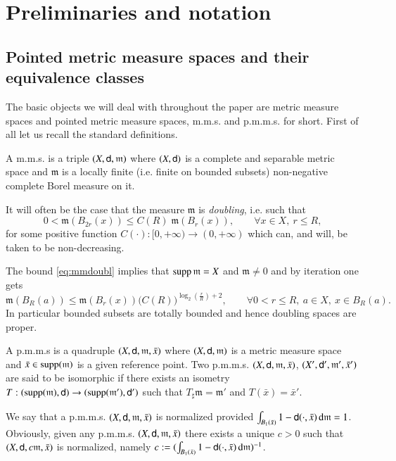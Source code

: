 \documentclass[11pt,reqno]{amsart}
\newcommand{\supp}{\mathop{\rm supp}\nolimits}
\newcommand{\mm}{\mathfrak m}
\newcommand{\sfd}{{\sf d}}
\renewcommand{\d}{{\rm{d}}}
\theoremstyle{definition}
\theoremstyle{remark}
\theoremstyle{remark}
\theoremstyle{remark}
\theoremstyle{remark}
\theoremstyle{remark}
\theoremstyle{remark}
\theoremstyle{remark}
\begin{document}
\section{Preliminaries and notation}\label{Sec:Prel}
\subsection{Pointed metric measure spaces and their equivalence classes}
The basic objects we will deal with throughout the paper are metric measure spaces and pointed metric measure spaces, m.m.s. and p.m.m.s. 
 for short. First of all let us recall the standard definitions. 
 
A m.m.s. is a triple $(X,\sfd,\mm)$ where $(X,\sfd)$ is a complete and separable metric space and  $\mm$ is a locally finite (i.e. finite on bounded subsets) non-negative complete Borel measure  on it. 
 

It will often be the case that the measure 
$\mm$ is \emph{doubling}, i.e. such that
\begin{equation}\label{eq:mmdoubl}
0< \mm(B_{2r}(x)) \leq C(R) \;  \mm(B_r(x)),\qquad\forall x\in X,\ r\leq R,
\end{equation}
for some positive function $C(\cdot):[0,+\infty) \to (0,+\infty)$ which can, and will, be taken to be non-decreasing.


The bound  \eqref{eq:mmdoubl} implies that $\supp \mm=X$ and $\mm \neq 0$ and by  iteration one gets
\begin{equation}\label{eq:genDoub}
 {\mm(B_R(a))}\leq \mm(B_r(x))\big(C(R)\big)^{\log_2(\frac{r}{R})+2}, \qquad\forall 0<r\leq R,\ a\in X,\ x\in B_R(a).
\end{equation}
In particular  bounded subsets are totally bounded and hence doubling spaces are proper. 

\smallskip

A p.m.m.s is a quadruple $(X,\sfd,\mm,\bar x)$ where $(X,\sfd,\mm)$ is a metric measure space and $\bar x\in \supp(\mm)$ is a given reference point. Two p.m.m.s.  $(X,\sfd,\mm, \bar{x})$,  $(X',\sfd',\mm', \bar{x}')$ are said to be isomorphic if there exists an isometry $T:(\supp(\mm),\sfd)\to(\supp(\mm'),\sfd')$ such that $T_\sharp\mm=\mm'$ and $T(\bar{x})=\bar{x}'$.



We say that a p.m.m.s. $(X,\sfd,\mm,\bar x)$ is normalized provided $\int_{B_1(\bar x)}1-\sfd(\cdot,\bar x)\,\d\mm=1$. Obviously, given any p.m.m.s. $(X,\sfd,\mm,\bar x)$ there exists a unique $c> 0$ such that $(X,\sfd,c\mm,\bar x)$ is normalized, namely $c:=(\int_{B_1(\bar x)}1-\sfd(\cdot,\bar x)\,\d\mm)^{-1}$.
\end{document}
